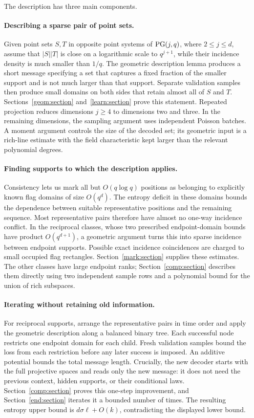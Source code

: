 The description has three main components.

\paragraph{Describing a sparse pair of point sets.}
Given point sets $S,T$ in opposite point systems of $\operatorname{PG}(j,q)$, where
$2\le j\le d$, assume that
$|S||T|$ is close on a logarithmic scale to $q^{j+1}$, while their
incidence density is much smaller than $1/q$. The geometric description
lemma produces a short message specifying a set that captures a fixed
fraction of the smaller support and is not much larger than that
support. Separate validation samples then produce small domains on
both sides that retain almost all of $S$ and $T$.
Sections~\ref{geom:section} and~\ref{learn:section} prove this statement.
Repeated projection reduces dimensions $j\ge4$ to dimensions two and
three. In the remaining dimensions, the sampling argument uses independent
Poisson batches. A moment argument controls the size of the decoded set;
its geometric input is a rich-line estimate with the field characteristic
kept larger than the relevant polynomial degrees.

\paragraph{Finding supports to which the description applies.}
Consistency lets us mark all but $O(q\log q)$ positions as belonging
to explicitly known flag domains of size $O(q^d)$. The entropy deficit
in these domains bounds the dependence between suitable representative
positions and the remaining sequence. Most representative pairs
therefore have almost no one-way incidence conflict. In the reciprocal
classes, whose two prescribed endpoint-domain bounds have product
$O(q^{d+1})$, a geometric argument turns this into sparse incidence
between endpoint supports. Possible exact
incidence coincidences are charged to small occupied flag rectangles.
Section~\ref{mark:section} supplies these estimates. The other classes
have large endpoint ranks; Section~\ref{comp:section} describes them
directly using two independent sample rows and a polynomial bound for
the union of rich subspaces.

\paragraph{Iterating without retaining old information.}
For reciprocal supports, arrange the representative pairs in time
order and apply the geometric description along a balanced binary
tree. Each successful node restricts one endpoint domain for each
child. Fresh validation samples bound the loss from each restriction
before any later success is imposed. An additive potential bounds the
total message length. Crucially, the new decoder starts with the full
projective spaces and reads only the new message: it does not need the
previous context, hidden supports, or their conditional laws.
Section~\ref{comp:section} proves this one-step improvement, and
Section~\ref{end:section} iterates it a bounded number of times. The
resulting entropy upper bound is $d\sigma\ell+O(k)$, contradicting the
displayed lower bound.


